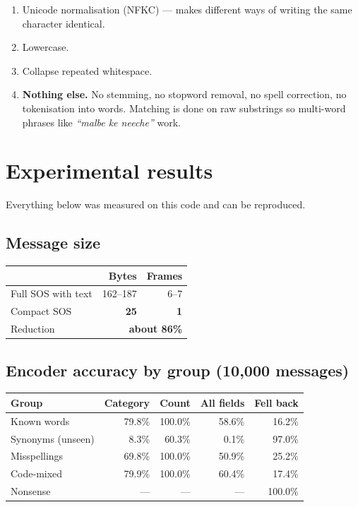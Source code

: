 \documentclass[11pt,a4paper]{article}
\begin{document}
\begin{enumerate}
\item Unicode normalisation (NFKC) --- makes different ways of writing the
      same character identical.
\item Lowercase.
\item Collapse repeated whitespace.
\item \textbf{Nothing else.} No stemming, no stopword removal, no spell
      correction, no tokenisation into words. Matching is done on raw
      substrings so multi-word phrases like \emph{``malbe ke neeche''} work.
\end{enumerate}

\section{Experimental results}

Everything below was measured on this code and can be reproduced.

\subsection{Message size}

\begin{center}
\begin{tabular}{lrr}
\toprule
 & \textbf{Bytes} & \textbf{Frames} \\
\midrule
Full SOS with text & 162--187 & 6--7 \\
Compact SOS & \textbf{25} & \textbf{1} \\
Reduction & \multicolumn{2}{r}{\textbf{about 86\%}} \\
\bottomrule
\end{tabular}
\end{center}

\subsection{Encoder accuracy by group (10{,}000 messages)}

\begin{center}
\begin{tabular}{lrrrr}
\toprule
\textbf{Group} & \textbf{Category} & \textbf{Count} & \textbf{All fields} & \textbf{Fell back} \\
\midrule
Known words      & 79.8\% & 100.0\% & 58.6\% & 16.2\% \\
Synonyms (unseen) & 8.3\% &  60.3\% &  0.1\% & 97.0\% \\
Misspellings     & 69.8\% & 100.0\% & 50.9\% & 25.2\% \\
Code-mixed       & 79.9\% & 100.0\% & 60.4\% & 17.4\% \\
Nonsense         & ---    & ---     & ---    & 100.0\% \\
\bottomrule
\end{tabular}
\end{center}
\end{document}
